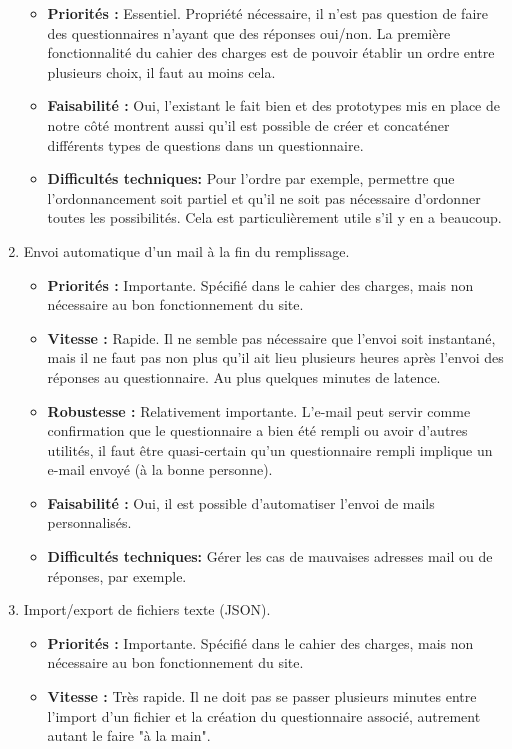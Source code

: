 \documentclass{article}
\begin{document}
\begin{enumerate}[noitemsep]
\begin{itemize}[noitemsep]
    \item \textbf{Priorités : }Essentiel. Propriété nécessaire, il n'est pas question de faire des questionnaires n'ayant que des réponses oui/non. La première fonctionnalité du cahier des charges est de pouvoir établir un ordre entre plusieurs choix, il faut au moins cela.
    \item \textbf{Faisabilité : }Oui, l'existant le fait bien et des prototypes mis en place de notre côté montrent aussi qu'il est possible de créer et concaténer différents types de questions dans un questionnaire.
    \item \textbf{Difficultés techniques: }Pour l'ordre par exemple, permettre que l'ordonnancement soit partiel et qu'il ne soit pas nécessaire d'ordonner toutes les possibilités. Cela est particulièrement utile s'il y en a beaucoup.
\end{itemize}
\item Envoi automatique d'un mail à la fin du remplissage.
\begin{itemize}[noitemsep]
    \item \textbf{Priorités : }Importante. Spécifié dans le cahier des charges, mais non nécessaire au bon fonctionnement du site.
    \item \textbf{Vitesse : }Rapide. Il ne semble pas nécessaire que l'envoi soit instantané, mais il ne faut pas non plus qu'il ait lieu plusieurs heures après l'envoi des réponses au questionnaire. Au plus quelques minutes de latence.
    \item \textbf{Robustesse : }Relativement importante. L'e-mail peut servir comme confirmation que le questionnaire a bien été rempli ou avoir d'autres utilités, il faut être quasi-certain qu'un questionnaire rempli implique un e-mail envoyé (à la bonne personne).
    \item \textbf{Faisabilité : }Oui, il est possible d'automatiser l'envoi de mails personnalisés.
    \item \textbf{Difficultés techniques: } Gérer les cas de mauvaises adresses mail ou de réponses, par exemple.
\end{itemize}
\newpage
\item Import/export de fichiers texte (JSON).
\begin{itemize}[noitemsep]
    \item \textbf{Priorités : }Importante. Spécifié dans le cahier des charges, mais non nécessaire au bon fonctionnement du site.
    \item \textbf{Vitesse : }Très rapide. Il ne doit pas se passer plusieurs minutes entre l'import d'un fichier et la création du questionnaire associé, autrement autant le faire "à la main".

\end{itemize}
\end{enumerate}
\end{document}
